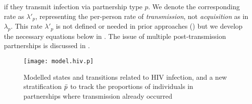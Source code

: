 if they transmit infection via partnership type $p$.
We denote the corresponding rate as $\lambda'_{p}$,
representing the per-person rate of \emph{transmission},
not \emph{acquisition} as in $\lambda_{p}$.
This rate $\lambda'_{p}$ is not defined or needed in prior approaches ()
but we develop the necessary equations below in .
The issue of multiple post-transmission partnerships is discussed in .
\begin{figure}
  \centering\texttt{[image: model.hiv.p]}
  \caption{Modelled states and transitions related to HIV infection,
    and a new stratification $\bar{p}$ to track
    the proportions of individuals in partnerships where transmission already occurred}
  \label{fig:model.hiv.p}
\end{figure}
